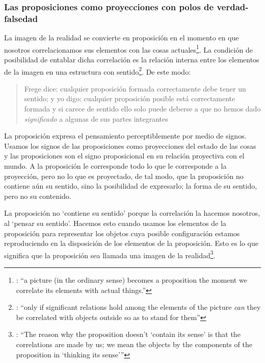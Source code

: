 \subsubsection{Las proposiciones como proyecciones con polos de verdad-falsedad}

La imagen de la realidad se convierte en proposición en el momento en que nosotros correlacionamos sus elementos con las cosas actuales\footnote{\cite[Cf.~][73]{anscombe1959iwt}: \enquote{a picture (in the ordinary sense) becomes a proposition the moment we correlate its elements with actual things.}}. La condición de posibilidad de entablar dicha correlación es la relación interna entre los elementos de la imagen en una estructura con sentido\footnote{\cite[Cf.~][68]{anscombe1959iwt}: \enquote{only if significant relations hold among the elements of the picture \emph{can} they be correlated with objects outside so as to stand for them}}. De este modo: \blockquote[{\cite[\S5.4733]{wittgenstein1922tractatuses}}]{Frege dice: cualquier proposición formada correctamente debe tener un sentido; y yo digo: cualquier proposición posible está correctamente formada y si carece de sentido ello solo puede deberse a que no hemos dado \emph{significado} a algunas de sus partes integrantes}.

La proposición expresa el pensamiento perceptiblemente por medio de signos. Usamos los signos de las proposiciones como proyecciones del estado de las cosas y las proposiciones son el signo proposicional en su relación proyectiva con el mundo. A la proposición le corresponde todo lo que le corresponde a la proyección, pero no lo que es proyectado, de tal modo, que la proposición no contiene aún su sentido, sino la posibilidad de expresarlo; la forma de su sentido, pero no su contenido\autocite[Cf.~][\S3.1, \S3.11--\S3.13]{wittgenstein1922tractatuses}.

La proposición no `contiene su sentido' porque la correlación la hacemos nosotros, al `pensar su sentido'. Hacemos esto cuando usamos los elementos de la proposición para representar los objetos cuya posible configuración estamos reproduciendo en la disposición de los elementos de la proposición. Esto es lo que significa que la proposición sea llamada una imagen de la realidad\footnote{\cite[cf.~][69]{anscombe1959iwt}: \enquote{The reason why the proposition doesn't `contain its sense' is that the correlations are made by us; we mean the objects by the components of the proposition in `thinking its sense'}}.

